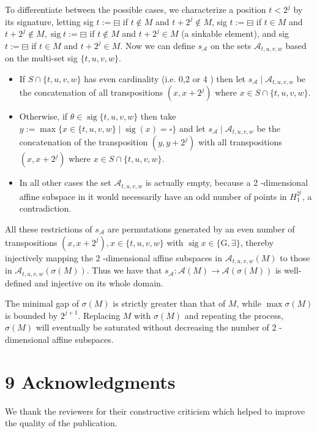 \documentclass[10pt]{article}
\begin{document}
To differentiate between the possible cases, we characterize a position $t<2^{j}$ by its signature, letting sig $t:=\boxminus$ if $t \notin M$ and $t+2^{j} \notin M$, sig $t:=\boxminus$ if $t \in M$ and $t+2^{j} \notin M, \operatorname{sig} t:=\boxminus$ if $t \notin M$ and $t+2^{j} \in M$ (a sinkable element), and sig $t:=\boxminus$ if $t \in M$ and $t+2^{j} \in M$. Now we can define $s_{\mathcal{A}}$ on the sets $\mathcal{A}_{t, u, v, w}$ based on the multi-set sig $\{t, u, v, w\}$.

\begin{itemize}
  \item If $S \cap\{t, u, v, w\}$ has even cardinality (i.e. 0,2 or 4 ) then let $s_{\mathcal{A}} \mid \mathcal{A}_{t, u, v, w}$ be the concatenation of all transpositions $\left(x, x+2^{j}\right)$ where $x \in S \cap\{t, u, v, w\}$.
  \item Otherwise, if $\theta \in \operatorname{sig}\{t, u, v, w\}$ then take $y:=\max \{x \in\{t, u, v, w\} \mid \operatorname{sig}(x)=\square\}$ and let $s_{\mathcal{A}} \mid \mathcal{A}_{t, u, v, w}$ be the concatenation of the transposition $\left(y, y+2^{j}\right)$ with all transpositions $\left(x, x+2^{j}\right)$ where $x \in S \cap\{t, u, v, w\}$.
  \item In all other cases the set $\mathcal{A}_{t, u, v, w}$ is actually empty, because a 2 -dimensional affine subspace in it would necessarily have an odd number of points in $H_{1}^{2^{j}}$, a contradiction.
\end{itemize}

All these restrictions of $s_{\mathcal{A}}$ are permutations generated by an even number of transpositions $\left(x, x+2^{j}\right), x \in\{t, u, v, w\}$ with $\operatorname{sig} x \in\{\mathrm{G}, \exists\}$, thereby injectively mapping the 2 -dimensional affine subspaces in $\mathcal{A}_{t, u, v, w}(M)$ to those in $\mathcal{A}_{t, u, v, w}(\sigma(M))$. Thus we have that $s_{\mathcal{A}}: \mathcal{A}(M) \rightarrow \mathcal{A}(\sigma(M))$ is well-defined and injective on its whole domain.

The minimal gap of $\sigma(M)$ is strictly greater than that of $M$, while $\max \sigma(M)$ is bounded by $2^{j+1}$. Replacing $M$ with $\sigma(M)$ and repeating the process, $\sigma(M)$ will eventually be saturated without decreasing the number of 2 -dimensional affine subspaces.

\section*{9 Acknowledgments}
We thank the reviewers for their constructive criticism which helped to improve the quality of the publication.
\end{document}
